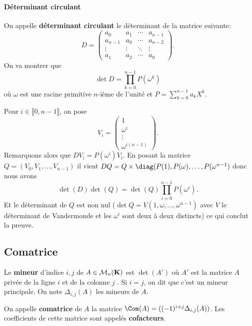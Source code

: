 \paragraph{Déterminant circulant}

On appelle \textbf{déterminant circulant} le déterminant de la matrice suivante:
\[  D = \begin{pmatrix} a_0 & a_1 & \cdots & a_{n-1} \\ a_{n-1} & a_0 & \cdots & a_{n-2} \\ \vdots & \vdots & \ddots & \vdots \\ a_1 & a_2 & \cdots & a_0 \end{pmatrix} .\]
On va montrer que
\[ \det D = \prod_{k=0}^{n-1} P(\omega^k)\]
où $\omega$ est une racine primitive $n$-ième de l'unité et $\displaystyle P = \sum_{k=0}^{n-1} a_k X^k$.  

Pour $i\in\llbracket 0, n-1\rrbracket$, on pose
\[V_i = \begin{pmatrix} 1 \\ \omega^{i} \\ \vdots \\ \omega^{i(n - 1)} \end{pmatrix}.\]
Remarquons alors que $DV_i = P(\omega^i)V_i$. En posant la matrice $Q = (V_0, V_1,\dots, V_{n-1} )$ il vient \linebreak$DQ = Q\times \diag(P(1), P(\omega),\dots, P(\omega^{n-1}) $ donc nous avons \[\det(D)\det(Q) = \det(Q)\prod_{i = 0}^{n - 1}P(\omega^i).\]
Et le déterminant de $Q$ est non nul ($\det Q = V(1, \omega, \dots, \omega^{n-1})$ avec $V$ le déterminant de Vandermonde et les $\omega^i$ sont deux à deux distincts) ce qui conclut la preuve. 

\subsection{Comatrice}

\begin{dfn}
    Le \textbf{mineur} d'indice $i,j$ de  $A \in  \mathcal  M_n(\mathbf K)$ est $\det(A')$ où  $A'$ est la matrice  $A$ privée de la ligne  $i$ et de la colonne  $j$ . Si $i=j$, on dit que c'est un mineur principale. On note  $\Delta_{i,j}(A)$ les mineurs de $A$.

    On appelle  \textbf{comatrice} de $A$ la matrice  $\Com(A)=((-1)^{i+j}\Delta_{i,j}(A))$. Les coefficients de cette matrice sont appelés \textbf{cofacteurs}.
\end{dfn}


